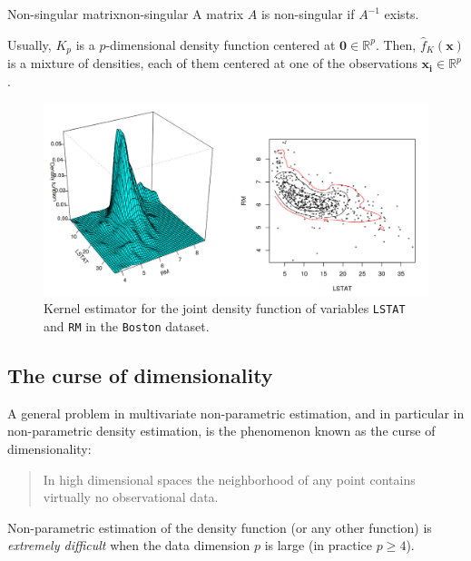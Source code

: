 \begin{definition}{Non-singular matrix}{non-singular}
	A matrix $A$ is non-singular if $A^{-1}$ exists.
\end{definition}

Usually, $K_p$ is a $p$-dimensional density function centered at $\boldsymbol{0} \in \mathbb{R}^p$.
Then, $\hat{f}_K(\boldsymbol{x})$ is a mixture of densities, each of them centered at one of
the observations $\boldsymbol{x_i} \in \mathbb{R}^p$.

\begin{figure}[H]
	\includegraphics{figures/multivariate-kernel-density}
	\caption{Kernel estimator for the joint density function of variables
		\texttt{LSTAT} and \texttt{RM} in the \texttt{Boston} dataset.}
\end{figure}

\subsection{The curse of dimensionality}%
\label{sec:curse-of-dimensionality}%
A general problem in multivariate non-parametric estimation, and in
particular in non-parametric density estimation, is the phenomenon
known as the curse of dimensionality:
\begin{quote}
	In high dimensional spaces the neighborhood of any point contains
	virtually no observational data.
\end{quote}

\begin{marker}
	Non-parametric estimation of the density function (or any other
	function) is \emph{extremely difficult} when the data dimension $p$ is large
	(in practice $p \geq 4$).
\end{marker}

\pagebreak
